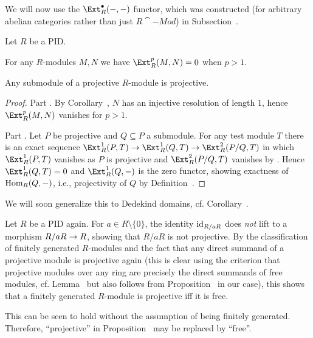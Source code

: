 \documentclass[a4paper,parskip=half,numbers=enddot, DIV=12]{scrreprt}
\begin{document}
We will now use the $\Ext_R^\bullet(-,-)$ functor, which was constructed (for arbitrary abelian categories rather than just $R\cat{-Mod}$) in Subsection~.
\begin{prop}
	Let $R$ be a PID.
	\begin{alphanumerate}
		\item For any $R$-modules $M,N$ we have $\Ext_R^p(M,N)=0$ when $p>1$.
		\item Any submodule of a projective $R$-module is projective.
	\end{alphanumerate}
\end{prop}
\begin{proof}
	Part . By Corollary~, $N$ has an injective resolution of length $1$, hence $\Ext_R^p(M,N)$ vanishes for $p>1$.
	
	Part . Let $P$ be projective and $Q\subseteq P$ a submodule. For any test module $T$ there is an exact sequence $\Ext_R^1(P,T)\morphism\Ext_R^1(Q,T)\morphism\Ext_R^2(P/Q,T)$ in which $\Ext_R^1(P,T)$ vanishes as $P$ is projective and $\Ext_R^2(P/Q,T)$ vanishes by . Hence $\Ext_R^1(Q,T)=0$ and $\Ext_R^1(Q,-)$ is the zero functor, showing exactness of $\operatorname{Hom}_R(Q,-)$, i.e., projectivity of $Q$ by Definition~.
\end{proof}
\begin{rem*}
	\begin{alphanumerate}
		\item We will soon generalize this to Dedekind domains, cf. Corollary~.
		\item Let $R$ be a PID again. For $a\in R\setminus \{0\}$, the identity $\operatorname{id}_{R/aR}$ does \emph{not} lift to a morphism $R/aR\morphism R$, showing that $R/aR$ is not projective. By the classification of finitely generated $R$-modules and the fact that any direct summand of a projective module is projective again (this is clear using the criterion that projective modules over any ring are precisely the direct summands of free modules, cf. Lemma~ but also follows from Proposition~ in our case), this shows that a finitely generated $R$-module is projective iff it is free.
		
		This can be seen to hold without the assumption of being finitely generated. Therefore, ``projective'' in Proposition~ may be replaced by ``free''.
	\end{alphanumerate}
\end{rem*}
\end{document}
